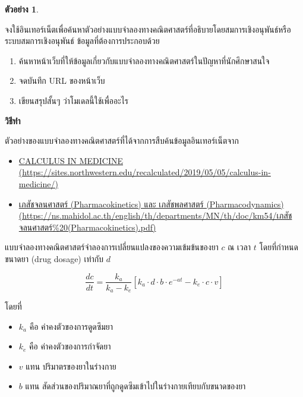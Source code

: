 \documentclass[
]{book}
\theoremstyle{definition}
\theoremstyle{definition}
\newtheorem{example}{ตัวอย่าง}[chapter]
\theoremstyle{definition}
\theoremstyle{definition}
\theoremstyle{remark}
\begin{document}
\begin{example}
\protect\hypertarget{exm:exm4}{}\label{exm:exm4}

จงใช้อินเทอร์เน็ตเพื่อค้นหาตัวอย่างแบบจำลองทางคณิตศาสตร์ที่อธิบายโดยสมการเชิงอนุพันธ์หรือระบบสมการเชิงอนุพันธ์ ข้อมูลที่ต้องการประกอบด้วย

\begin{enumerate}
\def\labelenumi{\arabic{enumi}.}
\item
  ค้นหาหน้าเว็บที่ให้ข้อมูลเกี่ยวกับแบบจำลองทางคณิตศาสตร์ในปัญหาที่นักศึกษาสนใจ
\item
  จดบันทึก URL ของหน้าเว็บ
\item
  เขียนสรุปสั้นๆ ว่าโมเดลนี้ใช้เพื่ออะไร
\end{enumerate}

\end{example}

\textbf{วิธีทำ}

ตัวอย่างของแบบจำลองทางคณิตศาสตร์ที่ได้จากการสืบค้นข้อมูลอินเทอร์เน็ตจาก

\begin{itemize}
\item
  \href{https://sites.northwestern.edu/recalculated/2019/05/05/calculus-in-medicine/}{CALCULUS IN MEDICINE (https://sites.northwestern.edu/recalculated/2019/05/05/calculus-in-medicine/)}
\item
  \href{https://ns.mahidol.ac.th/english/th/departments/MN/th/doc/km54/เภสัชจลนศาสตร์\%20(Pharmacokinetics).pdf}{เภสัชจลนศาสตร์ (Pharmacokinetics) และ เภสัชพลศาสตร์ (Pharmacodynamics) (https://ns.mahidol.ac.th/english/th/departments/MN/th/doc/km54/เภสัชจลนศาสตร์\%20(Pharmacokinetics).pdf)}
\end{itemize}

แบบจำลองทางคณิตศาสตร์จำลองการเปลี่ยนแปลงของความเข้มข้นของยา \(c\) ณ เวลา \(t\) โดยที่กำหนดขนาดยา (drug dosage) เท่ากับ \(d\)

\[
\frac{dc}{dt} = \frac{k_a}{k_a - k_e}\left[ k_a \cdot d \cdot b \cdot e^{-at} - k_e \cdot c \cdot v \right]
\]

โดยที่

\begin{itemize}
\item
  \(k_a\) คือ ค่าคงตัวของการดูดซึมยา
\item
  \(k_e\) คือ ค่าคงตัวของการกำจัดยา
\item
  \(v\) แทน ปริมาตรของยาในร่างกาย
\item
  \(b\) แทน สัดส่วนของปริมาณยาที่ถูกดูดซึมเข้าไปในร่างกายเทียบกับขนาดของยา
\end{itemize}
\end{document}
